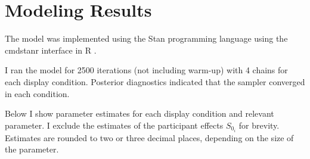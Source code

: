 \section{Modeling Results}
The model was implemented using the Stan programming language \parencite{carpenter2017stan} using the cmdstanr interface \parencite{cmdstanr} in R . 

I ran the model for 2500 iterations (not including warm-up) with 4 chains for each display condition. Posterior diagnostics indicated that the sampler converged in each condition.

Below I show parameter estimates for each display condition and relevant parameter. I exclude the estimates of the participant effects $S_{0_i}$ for brevity. Estimates are rounded to two or three decimal places, depending on the size of the parameter.
    
